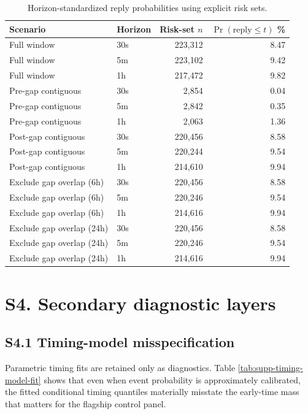 \begin{table}[h]
\centering
\caption{Horizon-standardized reply probabilities using explicit risk sets.}
\label{tab:supp-gap-horizon-standardized}
\small
\begin{tabular}{@{}llrr@{}}
\toprule
\textbf{Scenario} & \textbf{Horizon} & \textbf{Risk-set \(n\)} & \textbf{\(\Pr(\mathrm{reply}\le t)\) \%} \\
\midrule
Full window & 30s & 223,312 & 8.47 \\
Full window & 5m & 223,102 & 9.42 \\
Full window & 1h & 217,472 & 9.82 \\
Pre-gap contiguous & 30s & 2,854 & 0.04 \\
Pre-gap contiguous & 5m & 2,842 & 0.35 \\
Pre-gap contiguous & 1h & 2,063 & 1.36 \\
Post-gap contiguous & 30s & 220,456 & 8.58 \\
Post-gap contiguous & 5m & 220,244 & 9.54 \\
Post-gap contiguous & 1h & 214,610 & 9.94 \\
Exclude gap overlap (6h) & 30s & 220,456 & 8.58 \\
Exclude gap overlap (6h) & 5m & 220,246 & 9.54 \\
Exclude gap overlap (6h) & 1h & 214,616 & 9.94 \\
Exclude gap overlap (24h) & 30s & 220,456 & 8.58 \\
Exclude gap overlap (24h) & 5m & 220,246 & 9.54 \\
Exclude gap overlap (24h) & 1h & 214,616 & 9.94 \\
\bottomrule
\end{tabular}
\end{table}

\section*{S4. Secondary diagnostic layers}
\SupplementMixedEvidenceNote

\subsection*{S4.1 Timing-model misspecification}

Parametric timing fits are retained only as diagnostics. Table
\ref{tab:supp-timing-model-fit} shows that even when event probability is
approximately calibrated, the fitted conditional timing quantiles materially
misstate the early-time mass that matters for the flagship control panel.

